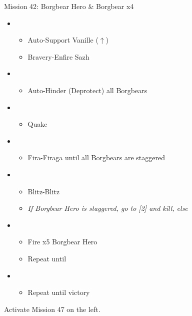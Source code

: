 \begin{battle}{Mission 42: Borgbear Hero \& Borgbear x4}
	\begin{itemize}
		\item \third
			\begin{itemize}
				\item Auto-Support Vanille ($\uparrow$)
				\item Bravery-Enfire Sazh
			\end{itemize}
		\item \fifth
			\begin{itemize}
				\item Auto-Hinder (Deprotect) all Borgbears
			\end{itemize}
		\item \first
			\begin{itemize}
				\item Quake
			\end{itemize}
		\item \sixth
			\begin{itemize}
				\item Fira-Firaga until all Borgbears are staggered
			\end{itemize}
		\item \first
			\begin{itemize}
				\item Blitz-Blitz
				\item \textit{If Borgbear Hero is staggered, go to [2] and kill, else}
			\end{itemize}	
		\item \sixth
			\begin{itemize}
				\item Fire x5 Borgbear Hero
				\item Repeat until \stagger
			\end{itemize}	
		\item \second
			\begin{itemize}
				\item Repeat until victory
			\end{itemize}																			
	\end{itemize}
\end{battle}

Activate Mission 47 on the left.

